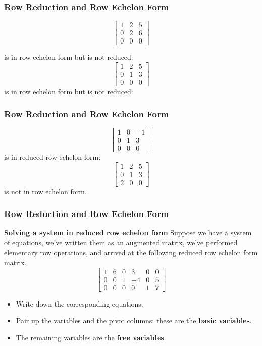   \begin{frame}[fragile]\frametitle{Row Reduction and Row Echelon Form}
\[
\begin{bmatrix}
 1 & 2 & 5 \\
 0 & 2 & 6 \\
 0 & 0 & 0
\end{bmatrix}
\]

is in row echelon form but is not reduced:
\[
\begin{bmatrix}
 1 & 2 & 5 \\
 0 & 1 & 3 \\
 0 & 0 & 0
\end{bmatrix}
\] 
is in row echelon form but is not reduced:
\end{frame}

  \begin{frame}[fragile]\frametitle{Row Reduction and Row Echelon Form}
\[
\begin{bmatrix}
 1 & 0 & -1 \\
 0 & 1 & 3 \\
 0 & 0 & 0
\end{bmatrix}
\] 
is in reduced row echelon form:
\[
\begin{bmatrix}
 1 & 2 & 5 \\
 0 & 1 & 3 \\
 2 & 0 & 0
\end{bmatrix}
\] 
is not in row echelon form.
\end{frame}

  \begin{frame}[fragile]\frametitle{Row Reduction and Row Echelon Form}

\textbf{Solving a system in reduced row echelon form}
Suppose we have a system of equations, we've written them as an 
augmented matrix, we've performed elementary row operations, and arrived
at the following reduced row echelon form matrix.  
\[
 \begin{bmatrix}
  1 & 6 & 0 & 3 & 0 & 0 \\
  0 & 0 & 1 & -4 & 0 & 5\\
  0 & 0 & 0 & 0 & 1 & 7 
 \end{bmatrix}
 \]
 
 
\begin{itemize}
 \item  Write down the corresponding equations.
 \item  Pair up the variables and the pivot columns: these are the \textbf{basic variables}.
 \item  The remaining variables are the \textbf{free variables}.
\end{itemize}

\end{frame}

